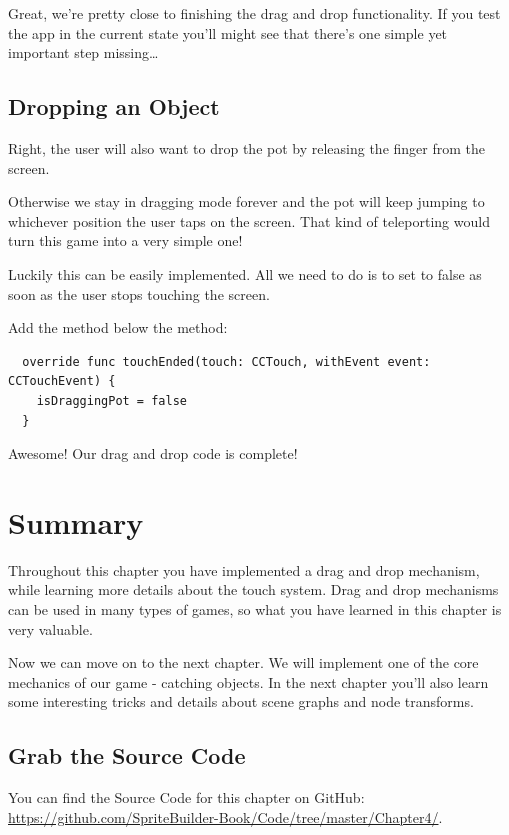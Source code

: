 Great, we're pretty close to finishing the drag and drop functionality. If you
test the app in the current state you'll might see that there's one simple yet
important step missing\ldots

\subsection{Dropping an Object}
Right, the user will also want to drop the pot by releasing the finger from the
screen. 

Otherwise we stay in dragging mode forever and the pot will keep jumping
to whichever position the user taps on the screen. That kind of teleporting
would turn this game into a very simple one!

Luckily this can be easily implemented. All we need to do is to set
 to false as soon as the user stops touching the
screen.
\begin{leftbar}
Add the  method below the  method:
\begin{lstlisting}
  override func touchEnded(touch: CCTouch, withEvent event: CCTouchEvent) {
    isDraggingPot = false
  }
\end{lstlisting}
\end{leftbar}
Awesome! Our drag and drop code is complete! 

\section{Summary} 
Throughout this chapter you have implemented a drag and drop mechanism, while
learning more details about the \cocos{} touch system. Drag and drop mechanisms
can be used in many types of games, so what you have learned in this chapter is very valuable.

Now we can move on to the next chapter. We will implement one of the core
mechanics of our game - catching objects. In the next chapter you'll also learn
some interesting tricks and details about scene graphs and node transforms.

\subsection{Grab the Source Code}
You can find the Source Code for this chapter on GitHub:
\url{https://github.com/SpriteBuilder-Book/Code/tree/master/Chapter4/}.